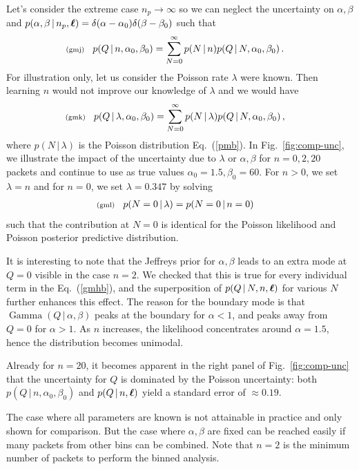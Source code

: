 \documentclass[11pt]{article}
\newcommand{\lleq}[1]{\label{#1} }
\renewcommand{\lleq}[1]{\label{#1} {\scriptstyle {\rm (#1)}} \hspace*{2ex} }
\newcommand{\cond}{\,|\,}
\newcommand{\refeq}[1]{Eq.~(\ref{#1})}
\newcommand{\reffig}[1]{Fig.~\ref{fig:#1}}
\DeclareMathOperator{\GammaDist}{Gamma}
\newcommand{\npack}{{n_p}}
\newcommand{\Lumtot}{Q}
\begin{document}
Let's consider the extreme case $\npack \to \infty$ so we can neglect
the uncertainty on $\alpha, \beta$ and
$p(\alpha, \beta \cond \npack, \bml) =
\delta(\alpha-\alpha_0)\delta(\beta - \beta_0)$ such that
\begin{align}
  \lleq{gmj}
  p(Q\cond n, \alpha_0, \beta_0)
  &=     \sum_{N=0}^\infty p(N\cond n) p(Q\cond N, \alpha_0, \beta_0) \, .
\end{align}
For illustration only, let us consider the Poisson rate $\lambda$ were
known. Then learning $n$ would not improve our knowledge of $\lambda$
and we would have
\begin{align}
  \lleq{gmk}
  p(Q\cond \lambda, \alpha_0, \beta_0)
  &=     \sum_{N=0}^\infty p(N\cond \lambda) p(Q\cond N, \alpha_0, \beta_0) \, ,
\end{align}
where $p(N \cond \lambda)$ is the Poisson distribution \refeq{pmb}.
In \reffig{comp-unc}, we illustrate the impact of the uncertainty due
to $\lambda$ or $\alpha, \beta$ for $n=0,2, 20$ packets and continue
to use as true values $\alpha_0 = 1.5, \beta_0 = 60$. For $n>0$, we
set $\lambda=n$ and for $n=0$, we set $\lambda = 0.347$ by solving
\begin{align}
  \lleq{gml}
  p(N=0 \cond \lambda) &= p(N=0 \cond n=0)
\end{align}
such that the contribution at $N=0$ is identical for the Poisson
likelihood and Poisson posterior predictive distribution.

It is interesting to note that the Jeffreys prior for $\alpha, \beta$
leads to an extra mode at $\Lumtot = 0$ visible in the case $n=2$. We
checked that this is true for every individual term in the
\refeq{gmhb}, and the superposition of $p(\Lumtot \cond N, n, \bml)$
for various $N$ further enhances this effect. The reason for the
boundary mode is that $\GammaDist(\Lumtot \cond \alpha, \beta)$ peaks
at the boundary for $\alpha<1$, and peaks away from $\Lumtot=0$ for
$\alpha>1$. As $n$ increases, the likelihood concentrates around
$\alpha=1.5$, hence the distribution becomes unimodal.

Already for $n=20$, it becomes apparent in the right panel of
\reffig{comp-unc} that the uncertainty for $\Lumtot$ is dominated by
the Poisson uncertainty: both $p(Q \cond n, \alpha_0, \beta_0)$ and
$p(Q \cond n, \bml)$ yield a standard error of $\approx 0.19$.

The case where all parameters are known is not attainable in practice
and only shown for comparison. But the case where $\alpha, \beta$ are
fixed can be reached easily if many packets from other bins can be
combined. Note that $n=2$ is the minimum number of packets to perform
the binned analysis.
\end{document}
